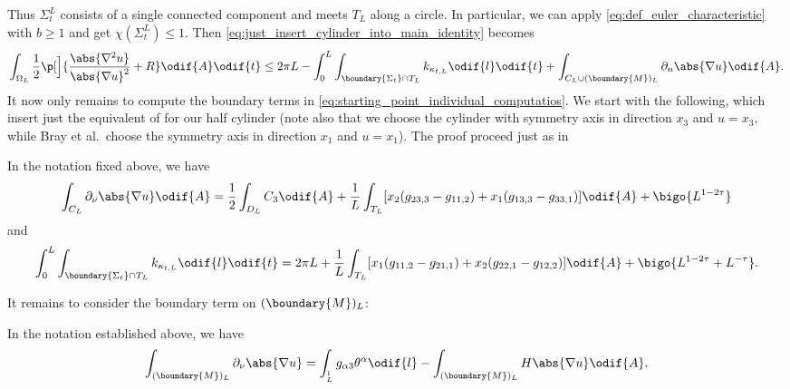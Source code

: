 \documentclass[titlepage,numbers=noenddot,headinclude,oneside,%
footinclude=true,cleardoublepage=empty,%
BCOR=5mm,paper=a4,fontsize=11pt,%
english,%
]{scrartcl}
\let\sphere\relax
\newcommand{\sphere}{\mathbb{S}}
\begin{document}
Thus \( \Sigma_t^L \) consists of a single connected component and meets \( T_L \) along a circle. In particular, we can apply \eqref{eq:def_euler_characteristic} with \( b\geq 1 \) and get \( \chi(\Sigma_t^L)\leq 1 \). Then \eqref{eq:just_insert_cylinder_into_main_identity} becomes
\begin{equation}
    \int_{\Omega_L} \frac{1}{2}\p[\Big]{\frac{\abs{\nabla^2 u}}{\abs{\nabla u}^2}+R }\odif{A}\odif{t} \leq2\pi L- \int_{0}^{L}\int _{\boundary{\Sigma_t} \cap T_L}k_{\kappa_{t,L}}\odif{l}\odif{t}+ \int_{C_L\cup (\boundary{M})_L}\partial_{n} \abs{\nabla u}\odif{A}.\label{eq:starting_point_individual_computations}
\end{equation}
It now only remains to compute the boundary terms in \eqref{eq:starting_point_individual_computatios}. We start with the following, which insert just the equivalent of \cite[Lemma 6.1 and Lemma 6.2]{brayHarmonicFunctionsMass2019} for our half cylinder (note also that we choose the cylinder with symmetry axis in direction \( x_3 \) and \( u=x_3 \), while Bray et al.~choose the symmetry axis in direction \( x_1 \) and \( u=x_1 \)). The proof proceed just as in \cite{brayHarmonicFunctionsMass2019}
\begin{lemma}
    In the notation fixed above, we have
    \begin{equation*}
        \int_{C_L} \partial_\nu\abs{\nabla u}\odif{A}=\frac{1}{2}\int_{D_L}C_3\odif{A}+\frac{1}{L}\int_{T_L}[x_2(g_{23,3}-g_{11,2})+x_1  (g_{13,3}-g_{33,1})]\odif{A}+\bigo{L^{1-2\tau}}
    \end{equation*}
    and
    \begin{equation*}
        \int_0^L\int _{\boundary{\Sigma_t} \cap T_L}k_{\kappa_{t,L}}\odif{l}\odif{t}=2\pi L +\frac{1}{L}\int_{T_L}[x_1(g_{11,2}-g_{21,1})+x_2(g_{22,1}-g_{12,2})]\odif{A}+\bigo{L^{1-2\tau}+L^{-\tau}}.
    \end{equation*}
\end{lemma}
It remains to consider the boundary term on \( (\boundary{M})_L \):
\begin{lemma}
    In the notation established above, we have
    \begin{equation*}
        \int_{(\boundary{M})_L} \partial_\nu \abs{\nabla u}=\int_{\sphere^1_L} g_{\alpha 3}\theta^\alpha \odif{l}-\int_{(\boundary{M})_L}H\abs{\nabla u}\odif{A}.
    \end{equation*}
\end{lemma}
\end{document}
